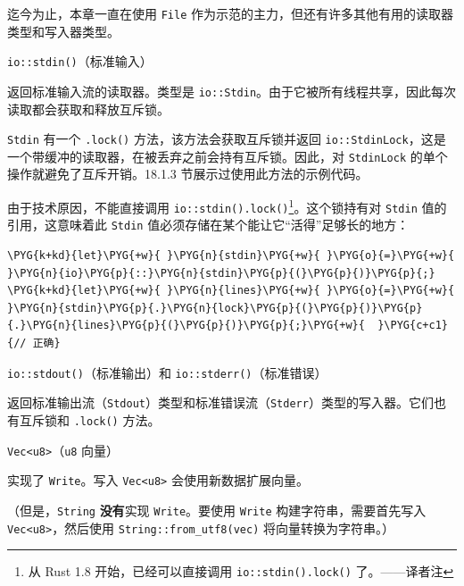 迄今为止，本章一直在使用 \texttt{File} 作为示范的主力，但还有许多其他有用的读取器类型和写入器类型。

\begin{mySidenote}
\texttt{io::stdin()}（标准输入）
\end{mySidenote}

返回标准输入流的读取器。类型是 \texttt{io::Stdin}。由于它被所有线程共享，因此每次读取都会获取和释放互斥锁。

\texttt{Stdin} 有一个 \texttt{.lock()} 方法，该方法会获取互斥锁并返回 \texttt{io::StdinLock}，这是一个带缓冲的读取器，在被丢弃之前会持有互斥锁。因此，对 \texttt{StdinLock} 的单个操作就避免了互斥开销。18.1.3 节展示过使用此方法的示例代码。

由于技术原因，不能直接调用 \texttt{io::stdin().lock()}\footnote{从 Rust 1.8 开始，已经可以直接调用 \texttt{io::stdin().lock()} 了。——译者注}。这个锁持有对 \texttt{Stdin} 值的引用，这意味着此 \texttt{Stdin} 值必须存储在某个能让它“活得”足够长的地方：

\begin{Verbatim}[commandchars=\\\{\},breaklines=true,breakanywhere=true,fontsize=\codefont,xleftmargin=17bp]
\PYG{k+kd}{let}\PYG{+w}{ }\PYG{n}{stdin}\PYG{+w}{ }\PYG{o}{=}\PYG{+w}{ }\PYG{n}{io}\PYG{p}{::}\PYG{n}{stdin}\PYG{p}{(}\PYG{p}{)}\PYG{p}{;}
\PYG{k+kd}{let}\PYG{+w}{ }\PYG{n}{lines}\PYG{+w}{ }\PYG{o}{=}\PYG{+w}{ }\PYG{n}{stdin}\PYG{p}{.}\PYG{n}{lock}\PYG{p}{(}\PYG{p}{)}\PYG{p}{.}\PYG{n}{lines}\PYG{p}{(}\PYG{p}{)}\PYG{p}{;}\PYG{+w}{  }\PYG{c+c1}{// 正确}
\end{Verbatim}

\begin{myNote}
\texttt{io::stdout()}（标准输出）和 \texttt{io::stderr()}（标准错误）
\end{myNote}

返回标准输出流（\texttt{Stdout}）类型和标准错误流（\texttt{Stderr}）类型的写入器。它们也有互斥锁和 \texttt{.lock()} 方法。

\begin{mySidenote}
\texttt{Vec<u8>}（\texttt{u8} 向量）
\end{mySidenote}

实现了 \texttt{Write}。写入 \texttt{Vec<u8>} 会使用新数据扩展向量。

（但是，\texttt{String} \textbf{没有}实现 \texttt{Write}。要使用 \texttt{Write} 构建字符串，需要首先写入 \texttt{Vec<u8>}，然后使用 \texttt{String::from\_utf8(vec)} 将向量转换为字符串。）

